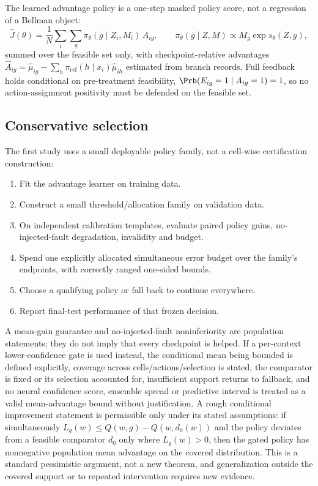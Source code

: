 The learned advantage policy is a one-step masked policy score, not a
regression of a Bellman object:
\begin{equation}
 \widehat J(\theta)=\frac1N\sum_i\sum_{g}\pi_\theta(g\mid Z_i,M_i)\,\widehat A_{ig},
 \qquad
 \pi_\theta(g\mid Z,M)\propto M_g\exp s_\theta(Z,g),
 \label{eq:rl-objective}
\end{equation}
summed over the feasible set only, with checkpoint-relative advantages
$\widehat A_{ig}=\widehat\mu_{ig}-\sum_h\pi_{\mathrm{ref}}(h\mid x_i)\widehat\mu_{ih}$
estimated from branch records.  Full feedback holds conditional on
pre-treatment feasibility, $\Prb(E_{ig}=1\mid A_{ig}=1)=1$, so no
action-assignment positivity must be defended on the feasible set.

\subsection{Conservative selection}
\label{sec:b-conservative}

The first study uses a small deployable policy family, not a cell-wise
certification construction:
\begin{enumerate}[label=(\arabic*),leftmargin=2em]
\item Fit the advantage learner on training data.
\item Construct a small threshold/allocation family on validation data.
\item On independent calibration templates, evaluate paired policy gains,
  no-injected-fault degradation, invalidity and budget.
\item Spend one explicitly allocated simultaneous error budget over the
  family's endpoints, with correctly ranged one-sided bounds.
\item Choose a qualifying policy or fall back to continue everywhere.
\item Report final-test performance of that frozen decision.
\end{enumerate}
A mean-gain guarantee and no-injected-fault noninferiority are population
statements; they do not imply that every checkpoint is helped.  If a
per-context lower-confidence gate is used instead, the conditional mean being
bounded is defined explicitly, coverage across cells/actions/selection is
stated, the comparator is fixed or its selection accounted for, insufficient
support returns to fallback, and no neural confidence score, ensemble spread or
predictive interval is treated as a valid mean-advantage bound without
justification.  A rough conditional improvement statement is permissible only
under its stated assumptions: if simultaneously
$L_g(w)\le Q(w,g)-Q(w,d_0(w))$ and the policy deviates from a feasible
comparator $d_0$ only where $L_g(w)>0$, then the gated policy has nonnegative
population mean advantage on the covered distribution.  This is a standard
pessimistic argument, not a new theorem, and generalization outside the covered
support or to repeated intervention requires new evidence.

